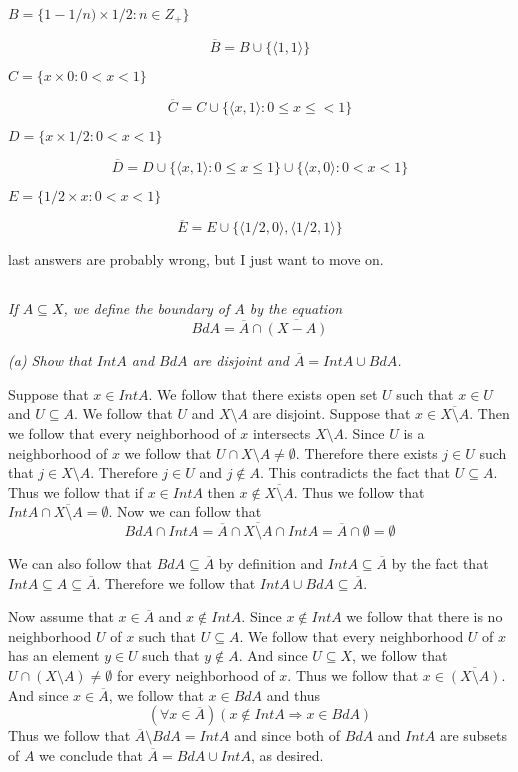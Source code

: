 \documentclass[11pt,oneside,titlepage]{book}
\DeclareMathOperator \ra {\Rightarrow}
\newcommand{\eangle}[1]{\langle #1 \rangle}
\newcommand{\set}[1]{\{ #1 \}}
\begin{document}
\textit{$B = \set{1 - 1/n) \times 1/2: n \in Z_+}$}

$$\overline{B} = B \cup \set{\eangle{1, 1}}$$

\textit{$C = \set{x \times 0: 0 < x < 1}$}

$$\overline{C} = C \cup \set{\eangle{x, 1}: 0 \leq x \leq < 1}$$

\textit{$D = \set{x \times 1/2: 0 < x < 1}$}

$$\overline{D} = D \cup \set{\eangle{x, 1}: 0 \leq x \leq 1} \cup
\set{\eangle{x, 0}: 0 < x < 1} $$

\textit{$E = \set{1/2 \times x: 0 < x < 1}$}

$$\overline{E} = E \cup \set{\eangle{1/2, 0}, \eangle{1/2, 1}}$$

last answers are probably wrong, but I just want to move on.

\subsection{}

\textit{If $A \subseteq X$, we define the boundary of $A$ by the equation
  $$Bd A = \overline{A} \cap \overline{(X - A)}$$}

\textit{(a) Show that $Int A$ and $Bd A$ are disjoint and $\overline{A} = Int A \cup Bd A$.}

Suppose that $x \in Int A$. We follow that there exists open set $U$ such that
$x \in U$ and $U \subseteq A$. We follow that $U$ and $X \setminus A$ are disjoint.
Suppose that $x \in \overline{X \setminus A}$. Then we follow that
every neighborhood of $x$ intersects $X \setminus A$. Since $U$ is a neighborhood of $x$
we follow that $U \cap X \setminus A \neq \emptyset$. Therefore there exists
$j \in U$ such that $j \in X \setminus A$. Therefore $j \in U$ and $j \notin A$.
This contradicts the fact that $U \subseteq A$. Thus we follow that if $x \in Int A$
then $x \notin \overline{X \setminus A}$. Thus we follow that
$Int A \cap \overline{X \setminus A} = \emptyset$.
Now we can follow that
$$Bd A \cap Int A  = \overline{A} \cap \overline{X \setminus A} \cap Int A =
\overline{A} \cap \emptyset = \emptyset$$

We can also follow that $Bd A \subseteq \overline{A}$ by definition and
$Int A \subseteq \overline{A}$ by the fact that
$Int A \subseteq A \subseteq \overline{A}$. Therefore we follow that
$Int A \cup Bd A \subseteq \overline{A}$.

Now assume that $x \in \overline{A}$ and $x \notin Int A$. Since $x \notin Int A$
we follow that there is no neighborhood $U$ of $x$ such that $U \subseteq A$.
We follow that every neighborhood $U$ of $x$ has an element $y \in U$ such that
$y \notin A$. And since $U \subseteq X$, we follow that $U \cap (X \setminus A) \neq \emptyset$
for every neighborhood of $x$. Thus we follow that $x \in \overline{(X \setminus A)}$.
And since $x \in \overline{A}$, we follow that $x \in Bd A$ and thus
$$(\forall x \in \overline{A}) (x \notin Int A \ra x \in Bd A)$$
Thus we follow that $\overline{A} \setminus Bd A = Int A$ and since
both of $Bd A$ and $Int A$ are subsets of $A$ we conclude that
$\overline{A} = Bd A \cup Int A$, as desired.
\end{document}
